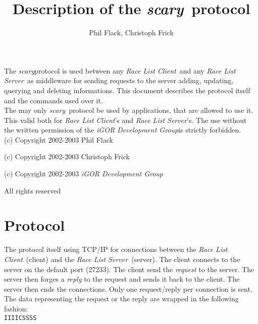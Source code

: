 \documentclass[a4paper,10pt]{article}
\newcommand{\scary}{{\it scary}}
\newcommand{\rls}{{\it Race List Server}}
\newcommand{\rlc}{{\it Race List Client}}
\newcommand{\gplopdev}{{\it iGOR Development Group}}
\newcommand{\scaryport}{27233}
\begin{document}
\title{Description of the \scary\ protocol}
\author{Phil Flack, Christoph Frick}

\maketitle

\vspace{2in}

\abstract

The \scary protocol is used between any \rlc\ and any \rls\ as middleware for
sending requests to the server adding, updating, querying and deleting
informations. This document describes the protocol itself and the commands
used over it.\\

The may only \scary\ protocol be used by applications, that are allowed to use
it. This valid both for \rlc's and \rls's. The use without the written
permission of the \gplopdev is strictly forbidden.\\

(c) Copyright 2002-2003 Phil Flack

(c) Copyright 2002-2003 Christoph Frick

(c) Copyright 2002-2003 \gplopdev

All rights reserved

\newpage


\section{Protocol}

The protocol itself using TCP/IP for connections between the \rlc\ (client) and
the \rls\ (server). The client connects to the server on the default port
(\scaryport). The client send the {\it request} to the server. The server then
forges a {\it reply} to the request and sends it back to the client. The
server then ends the connections. Only one request/reply per connection is
sent.\\

The data representing the request or the reply are wrapped in the following
fashion:\\

{\tt IIIICSSSS}\\
\end{document}
